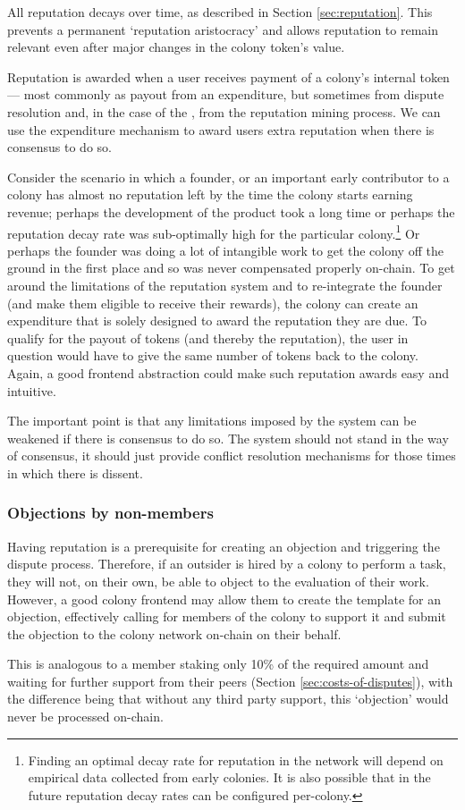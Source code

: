 All reputation decays over time, as described in Section \ref{sec:reputation}. This prevents a permanent `reputation aristocracy' and allows reputation to remain relevant even after major changes in the colony token's value.

Reputation is awarded when a user receives payment of a colony's internal token --- most commonly as payout from an expenditure, but sometimes from dispute resolution and, in the case of the \rc, from the reputation mining process. We can use the expenditure mechanism to award users extra reputation when there is consensus to do so.

Consider the scenario in which a founder, or an important early contributor to a colony has almost no reputation left by the time the colony starts earning revenue; perhaps the development of the product took a long time or perhaps the reputation decay rate was sub-optimally high for the particular colony.\footnote{Finding an optimal decay rate for reputation in the network will depend on empirical data collected from early colonies. It is also possible that in the future reputation decay rates can be configured per-colony.} Or perhaps the founder was doing a lot of intangible work to get the colony off the ground in the first place and so was never compensated properly on-chain. To get around the limitations of the reputation system and to re-integrate the founder (and make them eligible to receive their rewards), the colony can create an expenditure that is solely designed to award the reputation they are due. To qualify for the payout of tokens (and thereby the reputation), the user in question would have to give the same number of tokens back to the colony. Again, a good frontend abstraction could make such reputation awards easy and intuitive.

The important point is that any limitations imposed by the system can be weakened if there is consensus to do so. The system should not stand in the way of consensus, it should just provide conflict resolution mechanisms for those times in which there is dissent.

\subsubsection{Objections by non-members}

Having reputation is a prerequisite for creating an objection and triggering the dispute process. Therefore, if an outsider is hired by a colony to perform a task, they will not, on their own, be able to object to the evaluation of their work. However, a good colony frontend may allow them to create the template for an objection, effectively calling for members of the colony to support it and submit the objection to the colony network on-chain on their behalf.

This is analogous to a member staking only 10\% of the required amount and waiting for further support from their peers (Section \ref{sec:costs-of-disputes}), with the difference being that without any third party support, this `objection' would never be processed on-chain.
